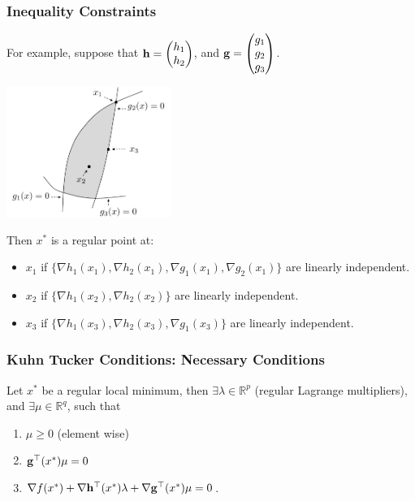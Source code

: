 \documentclass{beamer}
\begin{document}
\begin{frame}\frametitle{Inequality Constraints}
	For example, suppose that
	$\mathbf{h} = \begin{pmatrix}
	    	h_1\\h_2
	  	 \end{pmatrix}$, and 
	$\mathbf{g} = \begin{pmatrix}
	    	g_1\\g_2\\g_3
	  	 \end{pmatrix}$.
	\begin{center}
		\includegraphics[width=0.4\textwidth]
			{figures/chap18_feasible_points} 
	\end{center}

	  	 
	Then $x^{\ast}$ is a regular point at:
	\begin{itemize}
		\item $x_1$ if 
			$\{ \nabla h_1(x_1), \nabla h_2(x_1), \nabla g_1(x_1), \nabla g_2(x_1) \}$ are  linearly independent.
		\item $x_2$ if 
			$\{ \nabla h_1(x_2), \nabla h_2(x_2) \}$ are linearly independent.
		\item $x_3$ if 
			$\{ \nabla h_1(x_3), \nabla h_2(x_3), \nabla g_1(x_3) \}$ are linearly independent.
	\end{itemize}
\end{frame}

\begin{frame}\frametitle{Kuhn Tucker Conditions: Necessary Conditions}	
	\begin{theorem}
		Let $x^{\ast}$ be a regular local minimum, then 
		$\exists \lambda \in \mathbb{R}^p$ 
		(regular Lagrange multipliers), and
		$\exists \mu \in \mathbb{R}^q$, 
		such that
		\begin{enumerate}
		  \item $\mu \geq 0$ (element wise)
		  \item $\mathbf{g}^\top (x^{\ast})\mu = 0$
		  \item $ \nabla f(x^{\ast}) + \nabla \mathbf{h}^\top (x^{\ast})\lambda + \nabla \mathbf{g}^\top (x^{\ast})\mu = 0$.
		\end{enumerate}		
	\end{theorem}
\end{frame}
\end{document}
